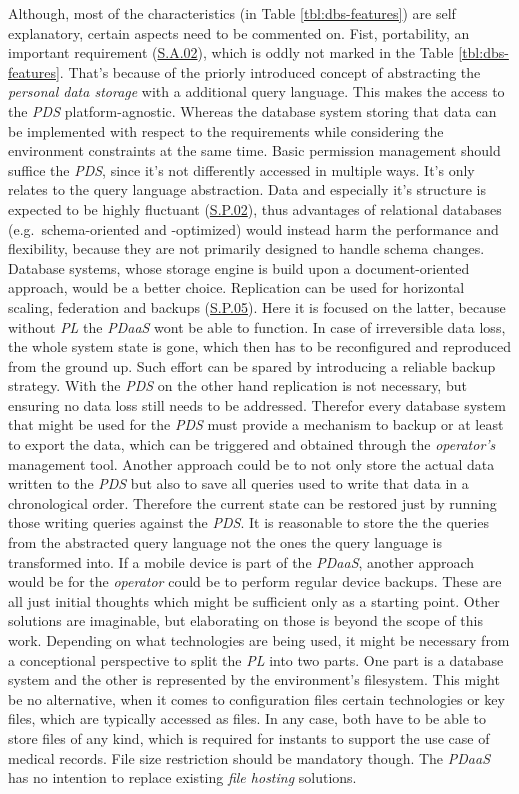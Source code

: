 \documentclass[12pt,english,a4paper,titlepage,cleardoublepage=empty,dottedtoc]{report}
\begin{document}
Although, most of the characteristics (in Table \ref{tbl:dbs-features})
are self explanatory, certain aspects need to be commented on. Fist,
portability, an important requirement
(\protect\hyperlink{sa02}{S.A.02}), which is oddly not marked in the
Table \ref{tbl:dbs-features}. That's because of the priorly introduced
concept of abstracting the \emph{personal data storage} with a
additional query language. This makes the access to the \emph{PDS}
platform-agnostic. Whereas the database system storing that data can be
implemented with respect to the requirements while considering the
environment constraints at the same time. Basic permission management
should suffice the \emph{PDS}, since it's not differently accessed in
multiple ways. It's only relates to the query language abstraction. Data
and especially it's structure is expected to be highly fluctuant
(\protect\hyperlink{sp02}{S.P.02}), thus advantages of relational
databases (e.g.~schema-oriented and -optimized) would instead harm the
performance and flexibility, because they are not primarily designed to
handle schema changes. Database systems, whose storage engine is build
upon a document-oriented approach, would be a better choice. Replication
can be used for horizontal scaling, federation and backups
(\protect\hyperlink{sp05}{S.P.05}). Here it is focused on the latter,
because without \emph{PL} the \emph{PDaaS} wont be able to function. In
case of irreversible data loss, the whole system state is gone, which
then has to be reconfigured and reproduced from the ground up. Such
effort can be spared by introducing a reliable backup strategy. With the
\emph{PDS} on the other hand replication is not necessary, but ensuring
no data loss still needs to be addressed. Therefor every database system
that might be used for the \emph{PDS} must provide a mechanism to backup
or at least to export the data, which can be triggered and obtained
through the \emph{operator's} management tool. Another approach could be
to not only store the actual data written to the \emph{PDS} but also to
save all queries used to write that data in a chronological order.
Therefore the current state can be restored just by running those
writing queries against the \emph{PDS}. It is reasonable to store the
the queries from the abstracted query language not the ones the query
language is transformed into. If a mobile device is part of the
\emph{PDaaS}, another approach would be for the \emph{operator} could be
to perform regular device backups. These are all just initial thoughts
which might be sufficient only as a starting point. Other solutions are
imaginable, but elaborating on those is beyond the scope of this work.
Depending on what technologies are being used, it might be necessary
from a conceptional perspective to split the \emph{PL} into two parts.
One part is a database system and the other is represented by the
environment's filesystem. This might be no alternative, when it comes to
configuration files certain technologies or key files, which are
typically accessed as files. In any case, both have to be able to store
files of any kind, which is required for instants to support the use
case of medical records. File size restriction should be mandatory
though. The \emph{PDaaS} has no intention to replace existing \emph{file
hosting} solutions.
\end{document}
